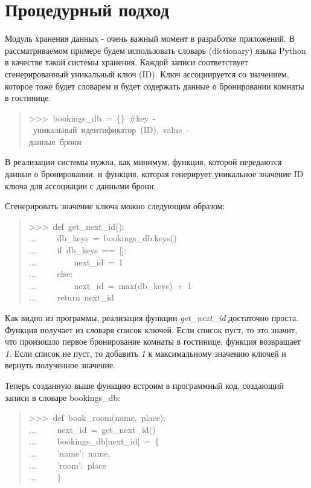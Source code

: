 \documentclass[a4paper,openany,twoside,final]{book}
\providecommand*{\DUroletitlereference}[1]{\textsl{#1}}
\begin{document}
\section{Процедурный подход%
  \label{id19}%
}

Модуль хранения данных - очень важный момент в разработке приложений.
В рассматриваемом примере будем использовать словарь (dictionary)
языка Python в качестве такой системы хранения.  Каждой записи
соответствует сгенерированный уникальный ключ (ID).  Ключ
ассоциируется со значением, которое тоже будет словарем и будет
содержать данные о бронировании комнаты в гостинице.

\begin{quote}{\ttfamily \raggedright \noindent
>{}>{}>~bookings\_db~=~\{\}~\#key~-~уникальный~идентификатор~(ID),~value~-\\
данные~брони
}
\end{quote}

В реализации системы нужна, как минимум, функция, которой передаются
данные о бронировании, и функция, которая генерирует уникальное
значение ID ключа для ассоциации с данными брони.

Сгенерировать значение ключа можно следующим образом:

\begin{quote}{\ttfamily \raggedright \noindent
>{}>{}>~def~get\_next\_id():\\
...~~~~~db\_keys~=~bookings\_db.keys()\\
...~~~~~if~db\_keys~==~{[}{]}:\\
...~~~~~~~~~next\_id~=~1\\
...~~~~~else:\\
...~~~~~~~~~next\_id~=~max(db\_keys)~+~1\\
...~~~~~return~next\_id
}
\end{quote}

Как видно из программы, реализация функции \DUroletitlereference{get\_next\_id} достаточно
проста.  Функция получает из словаря список ключей. Если список пуст,
то это значит, что произошло первое бронирование комнаты в гостинице,
функция возвращает \DUroletitlereference{1}.  Если список не пуст, то добавить \DUroletitlereference{1} к
максимальному значению ключей и вернуть полученное значение.

Теперь созданную выше функцию встроим в программный код, создающий
записи в словаре bookings\_db:

\begin{quote}{\ttfamily \raggedright \noindent
>{}>{}>~def~book\_room(name,~place):\\
...~~~~~next\_id~=~get\_next\_id()\\
...~~~~~bookings\_db{[}next\_id{]}~=~\{\\
...~~~~~'name':~name,\\
...~~~~~'room':~place\\
...~~~~~\}
}
\end{quote}
\end{document}
